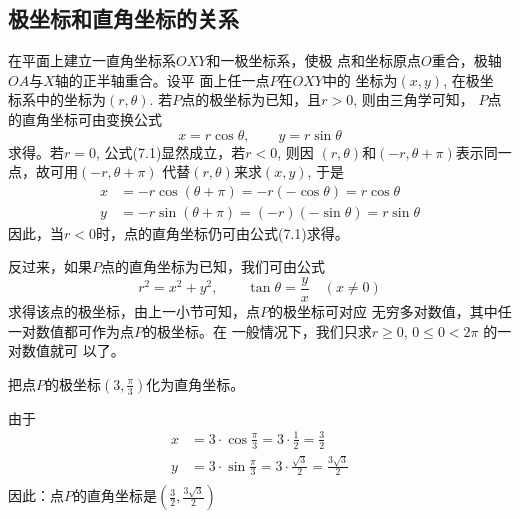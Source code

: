 \subsection{极坐标和直角坐标的关系}

\begin{figure}[htp]
    \centering
{}
    \caption{}
\end{figure}

在平面上建立一直角坐标系$OXY$和一极坐标系，使极
点和坐标原点$O$重合，极轴$OA$与$X$轴的正半轴重合。设平
面上任一点$P$在$OXY$中的
坐标为$(x,y)$, 在极坐
标系中的坐标为$(r,\theta)$. 
若$P$点的极坐标为已知，且$r>0$, 则由三角学可知，
$P$点的直角坐标可由变换公式
\begin{equation}
    x=r\cos\theta,\qquad y=r\sin\theta
\end{equation}
求得。若$r=0$, 公式(7.1)显然成立，若$r<0$, 则因
$(r,\theta)$和$(-r,\theta+\pi)$表示同一点，故可用$(-r,\theta+\pi)$
代替$(r,\theta)$来求$(x,y)$, 于是
\[\begin{split}
    x&=-r\cos(\theta +\pi )=-r(-\cos\theta )=r\cos\theta \\
    y&=-r\sin(\theta +\pi )=(-r)(-\sin\theta )=r\sin\theta 
\end{split}\]
因此，当$r<0$时，点的直角坐标仍可由公式(7.1)求得。

反过来，如果$P$点的直角坐标为已知，我们可由公式
\begin{equation}
    r^2=x^2+y^2,\qquad \tan\theta=\frac{y}{x}\quad (x\ne 0)
\end{equation}
求得该点的极坐标，由上一小节可知，点$P$的极坐标可对应
无穷多对数值，其中任一对数值都可作为点$P$的极坐标。在
一般情况下，我们只求$r\ge 0$, $0\le 0<2\pi$ 的一对数值就可
以了。

\begin{example}
    把点$P$的极坐标$\left(3,\frac{\pi}{3}\right)$化为直角坐标。
\end{example}

\begin{solution}
    由于
\[\begin{split}
    x&=3\cdot \cos \frac{\pi}{3}=3\cdot \frac{1}{2}=\frac{3}{2}\\
    y&=3\cdot \sin \frac{\pi}{3}=3\cdot \frac{\sqrt{3}}{2}=\frac{3\sqrt{3}}{2}\\
\end{split}\]
因此：点$P$的直角坐标是$\left(\frac{3}{2},\frac{3\sqrt{3}}{2}\right)$
\end{solution}

